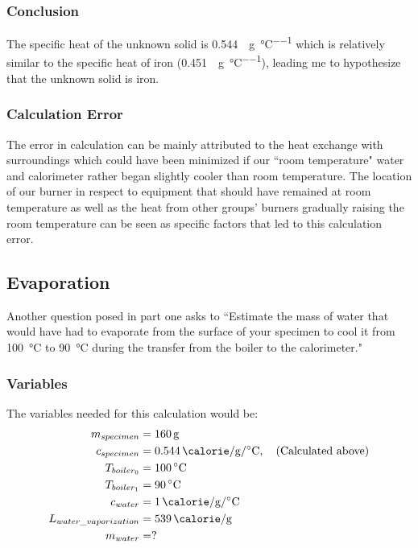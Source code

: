 \documentclass{article}
\begin{document}
\subsubsection{Conclusion}

The specific heat of the unknown solid is \SI{0.544}{\calorie \per \gram \per \celsius} which is relatively similar to the specific heat of iron (\SI{0.451}{\calorie \per \gram \per \celsius}), leading me to hypothesize that the unknown solid is iron.

\subsubsection{Calculation Error}

The error in calculation can be mainly attributed to the heat exchange with surroundings which could have been minimized if our ``room temperature" water and calorimeter rather began slightly cooler than room temperature. The location of our burner in respect to equipment that should have remained at room temperature as well as the heat from other groups' burners gradually raising the room temperature can be seen as specific factors that led to this calculation error.

\subsection{Evaporation}

Another question posed in part one asks to ``Estimate the mass of water that would have had to evaporate from the surface of your specimen to cool it from \SI{100}{\celsius} to \SI{90}{\celsius} during the transfer from the boiler to the calorimeter."

\subsubsection{Variables}

The variables needed for this calculation would be:
\begin{align*}
	m_{specimen} & = \SI{160}{\gram} \\
	c_{specimen} & = \SI{0.544}{\calorie \per \gram \per \celsius}, \quad \text{(Calculated above)} \\
	T_{boiler_0} & = \SI{100}{\celsius} \\
	T_{boiler_1} & = \SI{90}{\celsius} \\
	c_{water} & = \SI{1}{\calorie \per \gram \per \celsius} \\
	L_{water\_vaporization} & = \SI{539}{\calorie \per \gram} \\
	m_{water} & = ?
\end{align*}
\end{document}
